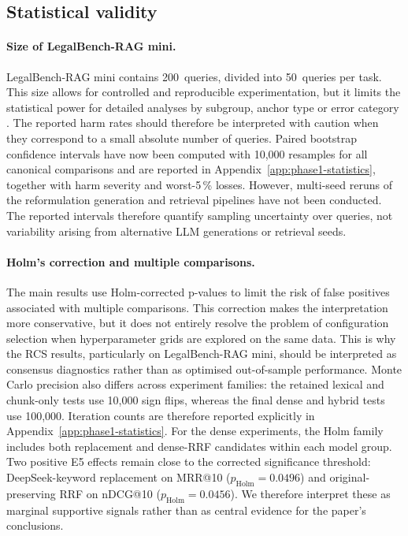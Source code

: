 \documentclass[a4paper,fleqn]{cas-dc}
\begin{document}
\subsection{Statistical validity}
\paragraph{Size of LegalBench-RAG mini.}
LegalBench-RAG mini contains 200~queries, divided into
50~queries per task. This size allows for
controlled and reproducible experimentation, but it
limits the statistical power for detailed analyses
by subgroup, anchor type or error category
. The reported harm rates should therefore be
interpreted with caution when they correspond to a
small absolute number of queries.
Paired bootstrap confidence intervals have now been
computed with 10,000 resamples for all canonical comparisons and
are reported in Appendix~\ref{app:phase1-statistics}, together
with harm severity and worst-5\,\% losses. However, multi-seed
reruns of the reformulation generation and retrieval pipelines
have not been conducted. The reported intervals therefore
quantify sampling uncertainty over queries, not variability
arising from alternative LLM generations or retrieval seeds.
\paragraph{Holm’s correction and multiple comparisons.}
The main results use Holm-corrected p-values
to limit the risk of false
positives associated with multiple comparisons. This
correction makes the interpretation more conservative,
but it does not entirely resolve the problem of
configuration selection when hyperparameter grids
are explored on the same data.
This is why the RCS results, particularly on
LegalBench-RAG mini, should be interpreted as
consensus diagnostics rather than as optimised
out-of-sample performance. Monte Carlo precision also differs
across experiment families: the retained lexical and chunk-only
tests use 10,000 sign flips, whereas the final dense and hybrid
tests use 100,000. Iteration counts are therefore reported
explicitly in Appendix~\ref{app:phase1-statistics}. For the dense experiments,
the Holm family includes both replacement and dense-RRF
candidates within each model group. Two positive E5 effects
remain close to the corrected significance threshold:
DeepSeek-keyword replacement on MRR@10
($p_{\mathrm{Holm}}=0.0496$) and original-preserving RRF on
nDCG@10 ($p_{\mathrm{Holm}}=0.0456$). We therefore interpret
these as marginal supportive signals rather than as central
evidence for the paper's conclusions.
\end{document}
